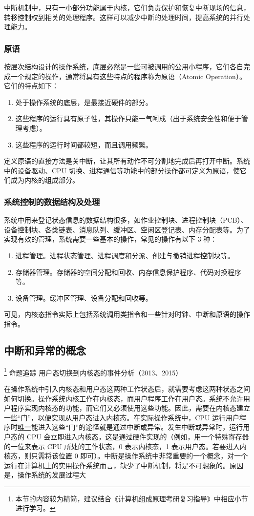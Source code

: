 \documentclass{ctexbook}
\begin{document}
	中断机制中，只有一小部分功能属于内核，它们负责保护和恢复中断现场的信息，转移控制权到相关的处理程序。这样可以减少中断的处理时间，提高系统的并行处理能力。
	
	\subsubsection{原语}
	按层次结构设计的操作系统，底层必然是一些可被调用的公用小程序，它们各自完成一个规定的操作，通常将具有这些特点的程序称为原语（Atomic Operation）。它们的特点如下：
	\begin{enumerate}
		\item 处于操作系统的底层，是最接近硬件的部分。
		\item 这些程序的运行具有原子性，其操作只能一气呵成（出于系统安全性和便于管理考虑）。
		\item 这些程序的运行时间都较短，而且调用频繁。
	\end{enumerate}
	定义原语的直接方法是关中断，让其所有动作不可分割地完成后再打开中断。系统中的设备驱动、CPU 切换、进程通信等功能中的部分操作都可定义为原语，使它们成为内核的组成部分。
	
	\subsubsection{系统控制的数据结构及处理}
	系统中用来登记状态信息的数据结构很多，如作业控制块、进程控制块（PCB）、设备控制块、各类链表、消息队列、缓冲区、空闲区登记表、内存分配表等。为了实现有效的管理，系统需要一些基本的操作，常见的操作有以下 3 种：
	\begin{enumerate}
		\item 进程管理。进程状态管理、进程调度和分派、创建与撤销进程控制块等。
		\item 存储器管理。存储器的空间分配和回收、内存信息保护程序、代码对换程序等。
		\item 设备管理。缓冲区管理、设备分配和回收等。
	\end{enumerate}
	可见，内核态指令实际上包括系统调用类指令和一些针对时钟、中断和原语的操作指令。
	
	\subsection{中断和异常的概念}\footnote{本节的内容较为精简，建议结合《计算机组成原理考研复习指导》中相应小节进行学习。}
	\colorbox{gray!20}{命题追踪 \enspace 用户态切换到内核态的事件分析（2013、2015）}
	
	在操作系统中引入内核态和用户态这两种工作状态后，就需要考虑这两种状态之间如何切换。操作系统内核工作在内核态，而用户程序工作在用户态。系统不允许用户程序实现内核态的功能，而它们又必须使用这些功能。因此，需要在内核态建立一些“门”，以便实现从用户态进入内核态。在实际操作系统中，CPU 运行用户程序时\underline{唯一}能进入这些“门”的途径就是通过中断或异常。发生中断或异常时，运行用户态的 CPU 会立即进入内核态，这是通过硬件实现的（例如，用一个特殊寄存器的一位来表示 CPU 所处的工作状态，0 表示内核态，1 表示用户态。若要进入内核态，则只需将该位置 0 即可）。中断是操作系统中非常重要的一个概念，对一个运行在计算机上的实用操作系统而言，缺少了中断机制，将是不可想象的。原因是，操作系统的发展过程大
	
\end{document}
